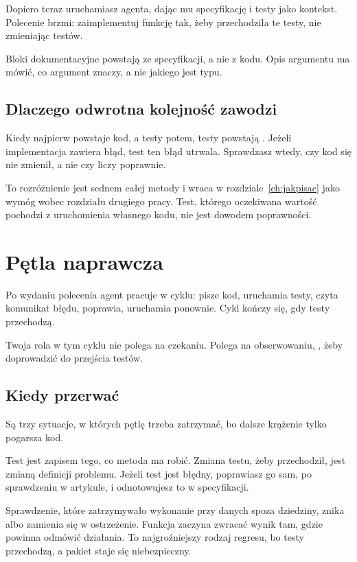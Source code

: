  Dopiero teraz uruchamiasz agenta, dając mu specyfikację i testy jako kontekst. Polecenie brzmi: zaimplementuj funkcję tak, żeby przechodziła te testy, nie zmieniając testów.

 Bloki dokumentacyjne powstają ze specyfikacji, a nie z kodu. Opis argumentu ma mówić, co argument znaczy, a nie jakiego jest typu.

\subsection{Dlaczego odwrotna kolejność zawodzi}

Kiedy najpierw powstaje kod, a testy potem, testy powstają . Jeżeli implementacja zawiera błąd, test ten błąd utrwala. Sprawdzasz wtedy, czy kod się nie zmienił, a nie czy liczy poprawnie.

To rozróżnienie jest sednem całej metody i wraca w rozdziale~\ref{ch:jakpisac} jako wymóg wobec rozdziału drugiego pracy. Test, którego oczekiwana wartość pochodzi z uruchomienia własnego kodu, nie jest dowodem poprawności.

\section{Pętla naprawcza}

Po wydaniu polecenia agent pracuje w cyklu: pisze kod, uruchamia testy, czyta komunikat błędu, poprawia, uruchamia ponownie. Cykl kończy się, gdy testy przechodzą.

Twoja rola w tym cyklu nie polega na czekaniu. Polega na obserwowaniu, , żeby doprowadzić do przejścia testów.

\subsection{Kiedy przerwać}

Są trzy sytuacje, w których pętlę trzeba zatrzymać, bo dalsze krążenie tylko pogarsza kod.

 Test jest zapisem tego, co metoda ma robić. Zmiana testu, żeby przechodził, jest zmianą definicji problemu. Jeżeli test jest błędny, poprawiasz go sam, po sprawdzeniu w artykule, i odnotowujesz to w specyfikacji.

 Sprawdzenie, które zatrzymywało wykonanie przy danych spoza dziedziny, znika albo zamienia się w ostrzeżenie. Funkcja zaczyna zwracać wynik tam, gdzie powinna odmówić działania. To najgroźniejszy rodzaj regresu, bo testy przechodzą, a pakiet staje się niebezpieczny.

